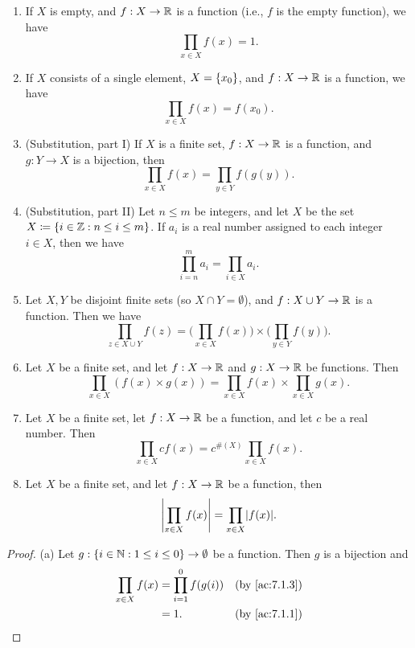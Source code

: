 \begin{ac}\label{ac:7.1.5}
  \mbox{}
  \begin{enumerate}
    \item If \(X\) is empty, and \(f : X \to \mathbb{R}\) is a function (i.e., \(f\) is the empty function), we have
          \[
            \prod_{x \in X} f(x) = 1.
          \]
    \item If \(X\) consists of a single element, \(X = \left\lbrace x_0\right\rbrace\), and \(f : X \to \mathbb{R}\) is a function, we have
          \[
            \prod_{x \in X} f(x) = f(x_0).
          \]
    \item (Substitution, part I) If \(X\) is a finite set, \(f : X \to \mathbb{R}\) is a function, and \(g : Y \to X\) is a bijection, then
          \[
            \prod_{x \in X} f(x) = \prod_{y \in Y} f(g(y)).
          \]
    \item (Substitution, part II) Let \(n \leq m\) be integers, and let \(X\) be the set \(X \coloneqq \left\lbrace i \in \mathbb{Z} : n \leq i \leq m\right\rbrace\).
          If \(a_i\) is a real number assigned to each integer \(i \in X\), then we have
          \[
            \prod_{i = n}^m a_i = \prod_{i \in X} a_i.
          \]
    \item Let \(X, Y\) be disjoint finite sets (so \(X \cap Y = \emptyset\)), and \(f : X \cup Y \to \mathbb{R}\) is a function.
          Then we have
          \[
            \prod_{z \in X \cup Y} f(z) = \Bigg(\prod_{x \in X} f(x)\Bigg) \times \Bigg(\prod_{y \in Y} f(y)\Bigg).
          \]
    \item Let \(X\) be a finite set, and let \(f : X \to \mathbb{R}\) and \(g : X \to \mathbb{R}\) be functions.
          Then
          \[
            \prod_{x \in X} (f(x) \times g(x)) = \prod_{x \in X} f(x) \times \prod_{x \in X} g(x).
          \]
    \item Let \(X\) be a finite set, let \(f : X \to \mathbb{R}\) be a function, and let \(c\) be a real number.
          Then
          \[
            \prod_{x \in X} cf(x) = c^{\#(X)} \prod_{x \in X} f(x).
          \]
    \item Let \(X\) be a finite set, and let \(f : X \to \mathbb{R}\) be a function, then
          \[
            \abs{\prod_{x \in X} f(x)} = \prod_{x \in X} \abs{f(x)}.
          \]
  \end{enumerate}
\end{ac}

\begin{proof}{(a)}
  Let \(g : \left\lbrace i \in \mathbb{N} : 1 \leq i \leq 0\right\rbrace \to \emptyset\) be a function.
  Then \(g\) is a bijection and
  \begin{align*}
    \prod_{x \in X} f(x) & = \prod_{i = 1}^0 f(g(i)) &  & \by{ac:7.1.3} \\
                         & = 1.                      &  & \by{ac:7.1.1}
  \end{align*}
\end{proof}

